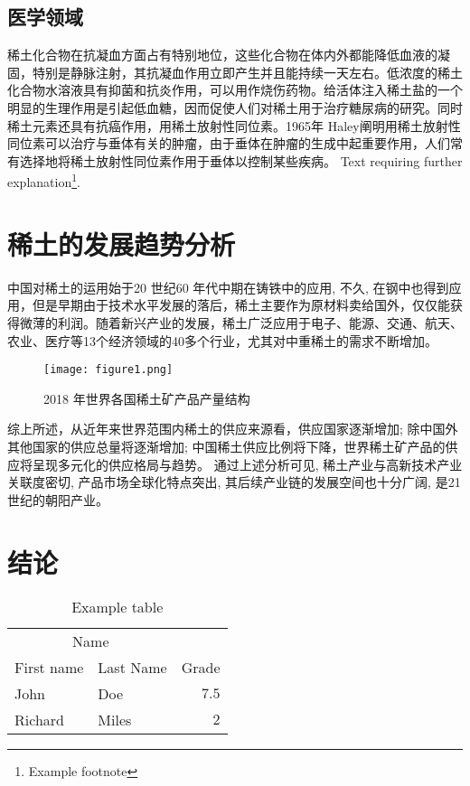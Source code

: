 \documentclass[twoside,twocolumn]{article}
\begin{document}
\subsection{医学领域}
稀土化合物在抗凝血方面占有特别地位，这些化合物在体内外都能降低血液的凝固，特别是静脉注射，其抗凝血作用立即产生并且能持续一天左右。低浓度的稀土化合物水溶液具有抑菌和抗炎作用，可以用作烧伤药物。给活体注入稀土盐的一个明显的生理作用是引起低血糖，因而促使人们对稀土用于治疗糖尿病的研究。同时稀土元素还具有抗癌作用，用稀土放射性同位素。1965年 Haley阐明用稀土放射性同位素可以治疗与垂体有关的肿瘤，由于垂体在肿瘤的生成中起重要作用，人们常有选择地将稀土放射性同位素作用于垂体以控制某些疾病。
Text requiring further explanation\footnote{Example footnote}.

\section{稀土的发展趋势分析}
中国对稀土的运用始于20 世纪60 年代中期在铸铁中的应用, 不久, 在钢中也得到应用，但是早期由于技术水平发展的落后，稀土主要作为原材料卖给国外，仅仅能获得微薄的利润。随着新兴产业的发展，稀土广泛应用于电子、能源、交通、航天、农业、医疗等13个经济领域的40多个行业，尤其对中重稀土的需求不断增加。
\begin{figure}[h]
  \centering
  \texttt{[image: figure1.png]}
  \caption{2018 年世界各国稀土矿产品产量结构}
\end{figure}
综上所述，从近年来世界范围内稀土的供应来源看，供应国家逐渐增加; 除中国外其他国家的供应总量将逐渐增加; 中国稀土供应比例将下降，世界稀土矿产品的供应将呈现多元化的供应格局与趋势。
通过上述分析可见, 稀土产业与高新技术产业关联度密切, 产品市场全球化特点突出, 其后续产业链的发展空间也十分广阔, 是21 世纪的朝阳产业。



\section{结论}

\begin{table}
\caption{Example table}
\centering
\begin{tabular}{llr}
\toprule
\multicolumn{2}{c}{Name} \\
\cmidrule(r){1-2}
First name & Last Name & Grade \\
\midrule
John & Doe & $7.5$ \\
Richard & Miles & $2$ \\
\bottomrule
\end{tabular}
\end{table}
\end{document}
